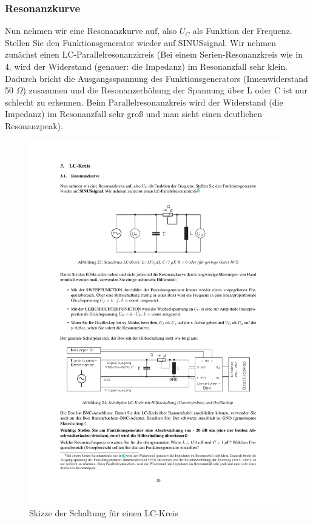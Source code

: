\documentclass[12pt]{scrartcl}
\begin{document}
\subsubsection{Resonanzkurve} 
Nun nehmen wir eine Resonanzkurve auf, also $U_C$ als Funktion der Frequenz. Stellen Sie den Funktionsgenerator wieder auf SINUSsignal. Wir nehmen zunächst einen LC-Parallelresonanzkreis (Bei einem Serien-Resonanzkreis wie in 4. wird der Widerstand (genauer: die Impedanz) im Resonanzfall sehr klein. Dadurch bricht die Ausgangsspannung des Funktionsgenerators (Innenwiderstand 50
$\Omega$) zusammen und die Resonanzerhöhung der Spannung über L oder C ist
nur schlecht zu erkennen. Beim Parallelresonanzkreis wird der Widerstand (die Impedanz) im Resonanzfall sehr groß und man sieht einen deutlichen Resonanzpeak).
\begin{figure}[htbp] 
  \centering
    \includegraphics[trim = 20mm 200mm 1mm 50mm, clip, scale = 1]{LC_kreis.pdf}
  	\caption[Skizze der Schaltung für einen LC-Kreis]{Skizze der Schaltung für einen LC-Kreis\footnotemark}
  \label{fig:LC-Kreis}
\end{figure}
\end{document}
